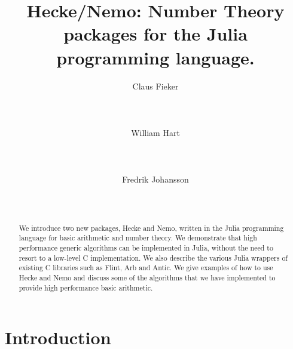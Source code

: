 \documentclass{sig-alternate-05-2015}
\begin{document}

\newtheorem{alg}{Algorithm}
\newtheorem{definition}{Definition}
\newtheorem{Assertion}{Assertion}

\makeatletter
\def\Ddots{\mathinner{\mkern1mu\raise\p@
\vbox{\kern7\p@\hbox{.}}\mkern2mu
\raise4\p@\hbox{.}\mkern2mu\raise7\p@\hbox{.}\mkern1mu}}
\makeatother

\title{Hecke/Nemo: Number Theory packages for the Julia programming language.}

\author{
\alignauthor Claus Fieker\\
   \\
   \\
   \\
\alignauthor William Hart\\
   \\
   \\
   \\
\alignauthor Fredrik Johansson\\
   \\
   \\
}

\maketitle

\begin{abstract}
We introduce two new packages, Hecke and Nemo, written in the Julia programming language
for basic arithmetic and number theory. We demonstrate that high performance generic
algorithms can be implemented in Julia, without the need to resort to a low-level C
implementation. We also describe the various Julia wrappers of existing C libraries
such as Flint, Arb and Antic. We give examples of how to use Hecke and Nemo and discuss
some of the algorithms that we have implemented to provide high performance basic
arithmetic.
\end{abstract}


\section{Introduction}
\end{document}
